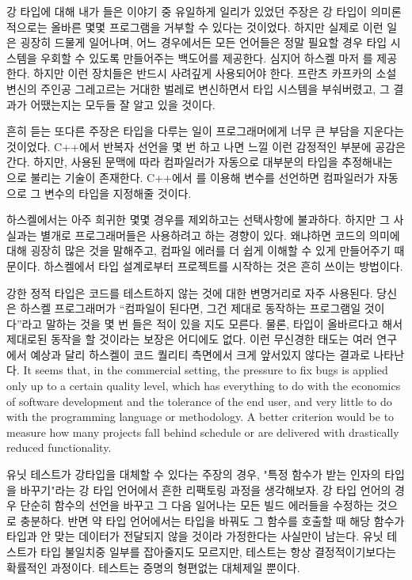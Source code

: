강 타입에 대해 내가 들은 이야기 중 유일하게 일리가 있었던 주장은 강 타입이 의미론적으로는 올바른 몇몇 프로그램을 거부할 수 있다는 것이었다.
하지만 실제로 이런 일은 굉장히 드물게 일어나며, 어느 경우에서든 모든 언어들은 정말 필요할 경우 타입 시스템을 우회할 수 있도록 만들어주는 백도어를 제공한다.
심지어 하스켈 마저 를 제공한다. 하지만 이런 장치들은 반드시 사려깊게 사용되어야 한다.
프란츠 카프카의 소설 변신의 주인공 그레고르는 거대한 벌레로 변신하면서 타입 시스템을 부숴버렸고, 그 결과가 어땠는지는 모두들 잘 알고 있을 것이다.

흔히 듣는 또다른 주장은 타입을 다루는 일이 프로그래머에게 너무 큰 부담을 지운다는 것이었다. 
C++에서 반복자 선언을 몇 번 하고 나면 느낄 이런 감정적인 부분에 공감은 간다.
하지만, 사용된 문맥에 따라 컴파일러가 자동으로 대부분의 타입을 추정해내는 \newterm{\trTypeInference}으로 불리는 기술이 존재한다.
C++에서 를 이용해 변수를 선언하면 컴파일러가 자동으로 그 변수의 타입을 지정해줄 것이다.

하스켈에서는 아주 희귀한 몇몇 경우를 제외하고는 \trTypeAnnotation\은 선택사항에 불과하다.
하지만 그 사실과는 별개로 프로그래머들은 \trTypeAnnotation\을 사용하려고 하는 경향이 있다.
왜냐하면 \trTypeAnnotation\은 코드의 의미에 대해 굉장히 많은 것을 말해주고, 컴파일 에러를 더 쉽게 이해할 수 있게 만들어주기 때문이다.
하스켈에서 타입 설계로부터 프로젝트를 시작하는 것은 흔히 쓰이는 방법이다. 

강한 정적 타입은 코드를 테스트하지 않는 것에 대한 변명거리로 자주 사용된다.
당신은 하스켈 프로그래머가 ``컴파일이 된다면, 그건 제대로 동작하는 프로그램일 것이다''라고 말하는 것을 몇 번 들은 적이 있을 지도 모른다.
물론, 타입이 올바르다고 해서 제대로된 동작을 할 것이라는 보장은 어디에도 없다.
이런 무신경한 태도는 여러 연구에서 예상과 달리 하스켈이 코드 퀄리티 측면에서 크게 앞서있지 않다는 결과로 나타난다.
It seems that, in the commercial setting, the pressure to
fix bugs is applied only up to a certain quality level, which has
everything to do with the economics of software development and the
tolerance of the end user, and very little to do with the programming
language or methodology. A better criterion would be to measure how many
projects fall behind schedule or are delivered with drastically reduced
functionality.

유닛 테스트가 강타입을 대체할 수 있다는 주장의 경우, "특정 함수가 받는 인자의 타입을 바꾸기"라는 강 타입 언어에서 흔한 리팩토링 과정을 생각해보자.
강 타입 언어의 경우 단순히 함수의 선언을 바꾸고 그 다음 일어나는 모든 빌드 에러들을 수정하는 것으로 충분하다.
반면 약 타입 언어에서는 타입을 바꿔도 그 함수를 호출할 때 해당 함수가 타입과 안 맞는 데이터가 전달되지 않을 것이라 가정한다는 사실만이 남는다.
유닛 테스트가 타입 불일치중 일부를 잡아줄지도 모르지만, 테스트는 항상 결정적이기보다는 확률적인 과정이다. 테스트는 증명의 형편없는 대체제일 뿐이다.

